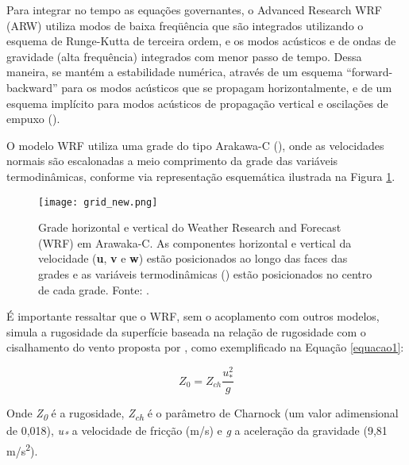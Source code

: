 \noindent Para integrar no tempo as equações governantes, o Advanced Research WRF (ARW) utiliza modos de baixa freqüência que são integrados 
          utilizando o esquema de Runge-Kutta de terceira ordem, e os modos acústicos e de ondas de gravidade (alta frequência) integrados 
          com menor passo de tempo. Dessa maneira, se mantém a estabilidade numérica, através de um esquema “forward-backward” para 
          os modos acústicos que se propagam horizontalmente, e de um esquema implícito para modos acústicos de propagação 
          vertical e oscilações de empuxo (\cite{Skamarock2008}).
\bigskip

\noindent O modelo WRF utiliza uma grade do tipo Arakawa-C (\cite{Arakawa1977}), onde as velocidades normais são
          escalonadas a meio comprimento da grade das variáveis termodinâmicas, conforme via representação esquemática ilustrada
          na Figura \textcolor{bleu_cite}{\ref{gradeswrf}}.
\bigskip

\begin{figure}[H]
    \centering
    \texttt{[image: grid\_new.png]}
    \caption{Grade horizontal e vertical do Weather Research and Forecast (WRF) em Arawaka-C. As componentes horizontal e vertical
                        da velocidade (\textbf{u}, \textbf{v} e \textbf{w}) estão posicionados ao longo das faces das grades e as variáveis termodinâmicas
                        (\straighttheta) estão posicionados no centro de cada grade. \newline Fonte: \textcite{Skamarock2008}.}
    \label{gradeswrf}
\end{figure}
\bigskip

\noindent É importante ressaltar que o WRF, sem o acoplamento com outros modelos, simula a rugosidade da superfície 
          baseada na relação de rugosidade com o cisalhamento do vento proposta por \textcite{Charnock1955},
          como exemplificado na Equação \textcolor{bleu_cite}{\ref{equacao1}}:
\bigskip

\begin{equation}
Z_{0} = Z_{ch} \frac{u_{*}^{2}}{g}
\label{equacao1}
\end{equation}

\bigskip

\noindent Onde \textit{Z\textsubscript{0}} é a rugosidade, \textit{Z\textsubscript{ch}} é o parâmetro de Charnock 
         (um valor adimensional de 0,018), \textit{u\textsubscript{*}} a velocidade de fricção (m/s) e \textit{g} a 
         aceleração da gravidade (9,81 m/s\textsuperscript{2}).
\bigskip

